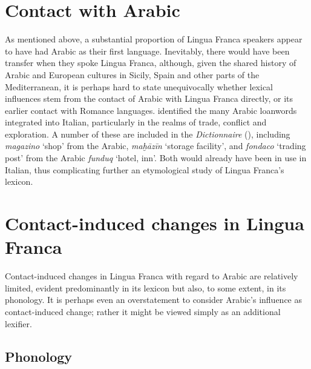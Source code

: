 \documentclass[output=paper]{langsci/langscibook}
\begin{document}
 \section{Contact with Arabic}
	
	As mentioned above, a substantial proportion of Lingua Franca speakers appear to have had Arabic as their first language. Inevitably, there would have been transfer when they spoke Lingua Franca, although, given the shared history of Arabic and European cultures in Sicily, Spain and other parts of the Mediterranean, it is perhaps hard to state unequivocally whether lexical influences stem from the contact of Arabic with Lingua Franca directly, or its earlier contact with Romance languages. \citet{Pellegrini1972} identified the many Arabic loanwords integrated into Italian, particularly in the realms of trade, conflict and exploration. A number of these are included in the \textit{Dictionnaire} (\citeyear{Anonymous1830}), including \textit{magazino} ‘shop’ from the Arabic, \textit{maḫāzīn} ‘storage facility’, and \textit{fondaco} ‘trading post’ from the Arabic \textit{funduq} ‘hotel, inn’. Both would already have been in use in Italian, thus complicating further an etymological study of Lingua Franca’s lexicon.
	

\section{Contact-induced changes in Lingua Franca}
	
	Contact-induced changes in Lingua Franca with regard to Arabic are relatively limited, evident predominantly in its lexicon but also, to some extent, in its phonology. It is perhaps even an overstatement to consider Arabic’s influence as contact-induced change; rather it might be viewed simply as an additional lexifier.
	
\subsection{Phonology}
	
\end{document}
